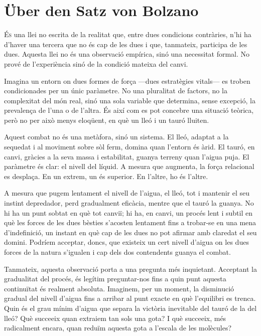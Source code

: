 \chapter{Über den Satz von Bolzano}


\lettrine[loversize=0.2, lines=2]{É}{s} una llei no escrita de la realitat que, entre dues condicions contràries, n’hi ha d’haver una tercera que no és cap de les dues i que, tanmateix, participa de les dues. Aquesta llei no és una observació empírica, sinó una necessitat formal. No prové de l’experiència sinó de la condició mateixa del canvi.

Imagina un entorn on dues formes de força —dues estratègies vitals— es troben condicionades per un únic paràmetre. No una pluralitat de factors, no la complexitat del món real, sinó una sola variable que determina, sense excepció, la prevalença de l’una o de l’altra. És així com es pot concebre una situació teòrica, però no per això menys eloqüent, en què un lleó i un tauró lluiten.

Aquest combat no és una metàfora, sinó un sistema. El lleó, adaptat a la sequedat i al moviment sobre sòl ferm, domina quan l’entorn és àrid. El tauró, en canvi, gràcies a la seva massa i estabilitat, guanya terreny quan l’aigua puja. El paràmetre és clar: el nivell del líquid. A mesura que augmenta, la força relacional es desplaça. En un extrem, un és superior. En l’altre, ho és l’altre.

A mesura que pugem lentament el nivell de l’aigua, el lleó, tot i mantenir el seu instint depredador, perd gradualment eficàcia, mentre que el tauró la guanya. No hi ha un punt sobtat en què tot canviï; hi ha, en canvi, un procés lent i subtil en què les forces de les dues bèsties s’acosten lentament fins a trobar-se en una mena d’indefinició, un instant en què cap de les dues no pot afirmar amb claredat el seu domini. Podríem acceptar, doncs, que existeix un cert nivell d'aigua on les dues forces de la natura s'igualen i cap dels dos contendents guanya el combat.

Tanmateix, aquesta observació porta a una pregunta més inquietant. Acceptant la gradualitat del procés, és legítim preguntar-nos fins a quin punt aquesta continuïtat és realment absoluta. Imaginem, per un moment, la disminució gradual del nivell d'aigua fins a arribar al punt exacte en què l'equilibri es trenca. Quin és el grau mínim d'aigua que separa la victòria inevitable del tauró de la del lleó? Què succeeix quan extraiem tan sols una gota? I què succeeix, més radicalment encara, quan reduïm aquesta gota a l'escala de les molècules?

